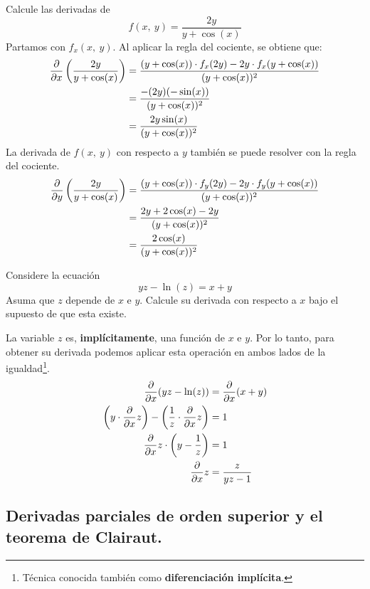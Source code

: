 \documentclass[12pt]{article}
\begin{document}
\ejemplo Calcule las derivadas de
\[
  f(x, \ y) = \frac{2y}{y + \cos(x)}
\]
\solucion Partamos con $f_{x}(x, \ y)$. Al aplicar la regla del cociente, se obtiene que:
\begin{align*}
  \frac{\partial }{\partial x}\left(\frac{2y}{y + \cos(x)}\right) &= \frac{(y + \cos(x)) \cdot f_{x}(2y) - 2y \cdot f_{x}(y + \cos(x))}{(y + \cos(x))^{2}} \\
                                                  &= \frac{-(2y)(-\sin(x))}{(y + \cos(x))^{2}} \\
                                                  &= \frac{2y \sin(x)}{(y + \cos(x))^{2}}
\end{align*}
La derivada de $f(x, \ y)$ con respecto a $y$ también se puede resolver con la regla del cociente.
\begin{align*}
\frac{\partial }{\partial y}\left(\frac{2y}{y + \cos(x)}\right) &= \frac{(y + \cos(x)) \cdot f_{y}(2y) - 2y \cdot f_{y}(y + \cos(x))}{(y + \cos(x))^{2}} \\
                                                &= \frac{2y + 2\cos(x) - 2y}{(y + \cos(x))^{2}} \\
                                                &= \frac{2\cos(x)}{(y + \cos(x))^{2}}
\end{align*}

\ejemplo Considere la ecuación
\[
  yz - \ln(z) = x + y
\]
Asuma que $z$ depende de $x$ e $y$. Calcule su derivada con respecto a $x$ bajo el supuesto de que esta existe.

\solucion La variable $z$ es, \textbf{implícitamente}, una función de $x$ e $y$. Por lo tanto, para obtener su derivada podemos aplicar esta operación en ambos lados de la igualdad\footnote{Técnica conocida también como \textbf{diferenciación implícita}.}.
\begin{align*}
                                                         \frac{\partial }{\partial x}(yz - \ln(z)) &= \frac{\partial }{\partial x}(x + y) \\
\left(y \cdot \frac{\partial }{\partial x}z\right) - \left(\frac{1}{z} \cdot \frac{\partial }{\partial x} z\right) &= 1 \\
                                  \frac{\partial }{\partial x}z \cdot \left(y - \frac{1}{z}\right) &= 1 \\
                                                                     \frac{\partial }{\partial x}z &= \frac{z}{yz - 1}
\end{align*}

\subsection{Derivadas parciales de orden superior y el teorema de Clairaut.}
\end{document}
